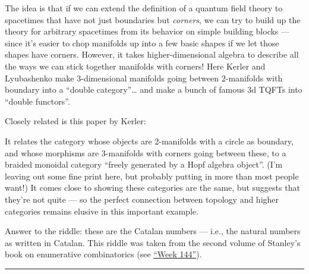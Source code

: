 \documentclass{article}
\def\tightlist{}
\renewcommand{\texttt}[1]{%
  \begingroup
  \ttfamily
  \begingroup\lccode`~=`/\lowercase{\endgroup\def~}{/\discretionary{}{}{}}%
  \begingroup\lccode`~=`[\lowercase{\endgroup\def~}{[\discretionary{}{}{}}%
  \begingroup\lccode`~=`.\lowercase{\endgroup\def~}{.\discretionary{}{}{}}%
  \catcode`/=\active\catcode`[=\active\catcode`.=\active
  \scantokens{#1\noexpand}%
  \endgroup
}
\begin{document}
The idea is that if we can extend the definition of a quantum field
theory to spacetimes that have not just boundaries but \emph{corners},
we can try to build up the theory for arbitrary spacetimes from its
behavior on simple building blocks --- since it's easier to chop
manifolds up into a few basic shapes if we let those shapes have
corners. However, it takes higher-dimensional algebra to describe all
the ways we can stick together manifolds with corners! Here Kerler and
Lyubashenko make \(3\)-dimensional manifolds going between
\(2\)-manifolds with boundary into a ``double category''\ldots{} and
make a bunch of famous 3d TQFTs into ``double functors''.

Closely related is this paper by Kerler:


It relates the category whose objects are \(2\)-manifolds with a circle
as boundary, and whose morphisms are \(3\)-manifolds with corners going
between these, to a braided monoidal category ``freely generated by a
Hopf algebra object''. (I'm leaving out some fine print here, but
probably putting in more than most people want!) It comes close to
showing these categories are the same, but suggests that they're not
quite --- so the perfect connection between topology and higher
categories remains elusive in this important example.

Answer to the riddle: these are the Catalan numbers --- i.e., the
natural numbers as written in Catalan. This riddle was taken from the
second volume of Stanley's book on enumerative combinatorics (see
\protect\hyperlink{week144}{``Week 144''}).

\begin{center}\rule{0.5\linewidth}{0.5pt}\end{center}
\end{document}
